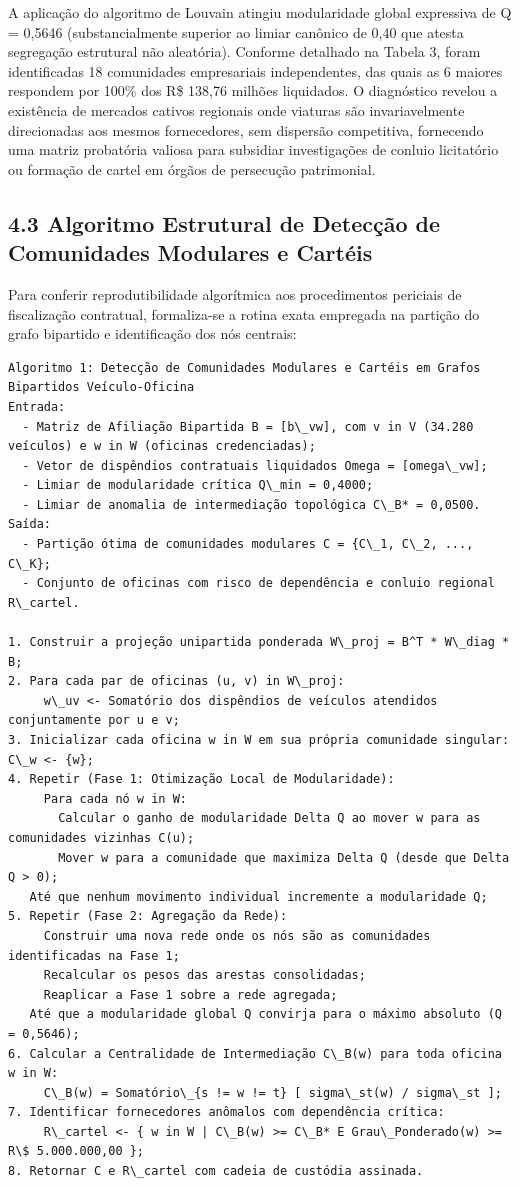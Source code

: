 \documentclass[10pt,a4paper,journal]{article}
\begin{document}
A aplicação do algoritmo de Louvain atingiu modularidade global expressiva de Q = 0,5646 (substancialmente superior ao limiar canônico de 0,40 que atesta segregação estrutural não aleatória). Conforme detalhado na Tabela 3, foram identificadas 18 comunidades empresariais independentes, das quais as 6 maiores respondem por 100\% dos R\$ 138,76 milhões liquidados. O diagnóstico revelou a existência de mercados cativos regionais onde viaturas são invariavelmente direcionadas aos mesmos fornecedores, sem dispersão competitiva, fornecendo uma matriz probatória valiosa para subsidiar investigações de conluio licitatório ou formação de cartel em órgãos de persecução patrimonial.

\subsection{4.3 Algoritmo Estrutural de Detecção de Comunidades Modulares e Cartéis}
Para conferir reprodutibilidade algorítmica aos procedimentos periciais de fiscalização contratual, formaliza-se a rotina exata empregada na partição do grafo bipartido e identificação dos nós centrais:

\begin{verbatim}
Algoritmo 1: Detecção de Comunidades Modulares e Cartéis em Grafos Bipartidos Veículo-Oficina
Entrada:
  - Matriz de Afiliação Bipartida B = [b\_vw], com v in V (34.280 veículos) e w in W (oficinas credenciadas);
  - Vetor de dispêndios contratuais liquidados Omega = [omega\_vw];
  - Limiar de modularidade crítica Q\_min = 0,4000;
  - Limiar de anomalia de intermediação topológica C\_B* = 0,0500.
Saída:
  - Partição ótima de comunidades modulares C = {C\_1, C\_2, ..., C\_K};
  - Conjunto de oficinas com risco de dependência e conluio regional R\_cartel.

1. Construir a projeção unipartida ponderada W\_proj = B^T * W\_diag * B;
2. Para cada par de oficinas (u, v) in W\_proj:
     w\_uv <- Somatório dos dispêndios de veículos atendidos conjuntamente por u e v;
3. Inicializar cada oficina w in W em sua própria comunidade singular: C\_w <- {w};
4. Repetir (Fase 1: Otimização Local de Modularidade):
     Para cada nó w in W:
       Calcular o ganho de modularidade Delta Q ao mover w para as comunidades vizinhas C(u);
       Mover w para a comunidade que maximiza Delta Q (desde que Delta Q > 0);
   Até que nenhum movimento individual incremente a modularidade Q;
5. Repetir (Fase 2: Agregação da Rede):
     Construir uma nova rede onde os nós são as comunidades identificadas na Fase 1;
     Recalcular os pesos das arestas consolidadas;
     Reaplicar a Fase 1 sobre a rede agregada;
   Até que a modularidade global Q convirja para o máximo absoluto (Q = 0,5646);
6. Calcular a Centralidade de Intermediação C\_B(w) para toda oficina w in W:
     C\_B(w) = Somatório\_{s != w != t} [ sigma\_st(w) / sigma\_st ];
7. Identificar fornecedores anômalos com dependência crítica:
     R\_cartel <- { w in W | C\_B(w) >= C\_B* E Grau\_Ponderado(w) >= R\$ 5.000.000,00 };
8. Retornar C e R\_cartel com cadeia de custódia assinada.
\end{verbatim}
\end{document}
